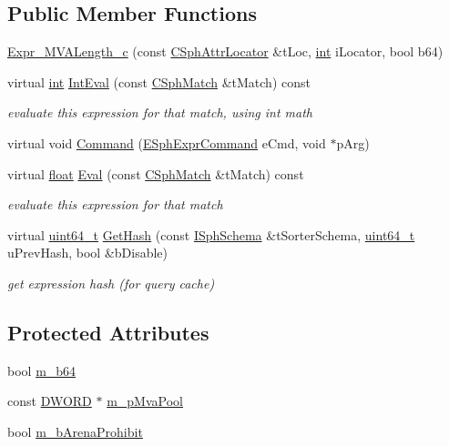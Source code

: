 \subsection*{Public Member Functions}
\begin{DoxyCompactItemize}
\item 
\hyperlink{classExpr__MVALength__c_aaaf4e4a341faaea7405e55d8619a6e90}{Expr\-\_\-\-M\-V\-A\-Length\-\_\-c} (const \hyperlink{structCSphAttrLocator}{C\-Sph\-Attr\-Locator} \&t\-Loc, \hyperlink{sphinxexpr_8cpp_a4a26e8f9cb8b736e0c4cbf4d16de985e}{int} i\-Locator, bool b64)
\item 
virtual \hyperlink{sphinxexpr_8cpp_a4a26e8f9cb8b736e0c4cbf4d16de985e}{int} \hyperlink{classExpr__MVALength__c_addf067ff8949ea133bf4cf8d3c0320ec}{Int\-Eval} (const \hyperlink{classCSphMatch}{C\-Sph\-Match} \&t\-Match) const 
\begin{DoxyCompactList}\small\item\em evaluate this expression for that match, using int math \end{DoxyCompactList}\item 
virtual void \hyperlink{classExpr__MVALength__c_ae160a06854cfe8e9682e57221ea10ae8}{Command} (\hyperlink{sphinxexpr_8h_a30be184fb07bd80c271360fc6094c818}{E\-Sph\-Expr\-Command} e\-Cmd, void $\ast$p\-Arg)
\item 
virtual \hyperlink{sphinxexpr_8cpp_a0e0d0739f7035f18f949c2db2c6759ec}{float} \hyperlink{classExpr__MVALength__c_a8ae6feab306f2302c5b784428e7eb8b1}{Eval} (const \hyperlink{classCSphMatch}{C\-Sph\-Match} \&t\-Match) const 
\begin{DoxyCompactList}\small\item\em evaluate this expression for that match \end{DoxyCompactList}\item 
virtual \hyperlink{sphinxstd_8h_aaa5d1cd013383c889537491c3cfd9aad}{uint64\-\_\-t} \hyperlink{classExpr__MVALength__c_a1c518f557fc44c5dff52284931fad223}{Get\-Hash} (const \hyperlink{classISphSchema}{I\-Sph\-Schema} \&t\-Sorter\-Schema, \hyperlink{sphinxstd_8h_aaa5d1cd013383c889537491c3cfd9aad}{uint64\-\_\-t} u\-Prev\-Hash, bool \&b\-Disable)
\begin{DoxyCompactList}\small\item\em get expression hash (for query cache) \end{DoxyCompactList}\end{DoxyCompactItemize}
\subsection*{Protected Attributes}
\begin{DoxyCompactItemize}
\item 
bool \hyperlink{classExpr__MVALength__c_a76229df82234dd86f864b01e8a2fa3c5}{m\-\_\-b64}
\item 
const \hyperlink{sphinxstd_8h_a798af1e30bc65f319c1a246cecf59e39}{D\-W\-O\-R\-D} $\ast$ \hyperlink{classExpr__MVALength__c_a7fd65b36c8176d92ec2d41ec58f4b2f0}{m\-\_\-p\-Mva\-Pool}
\item 
bool \hyperlink{classExpr__MVALength__c_a7c9e953f3a34ec5273ab6251ef69ab20}{m\-\_\-b\-Arena\-Prohibit}
\end{DoxyCompactItemize}
